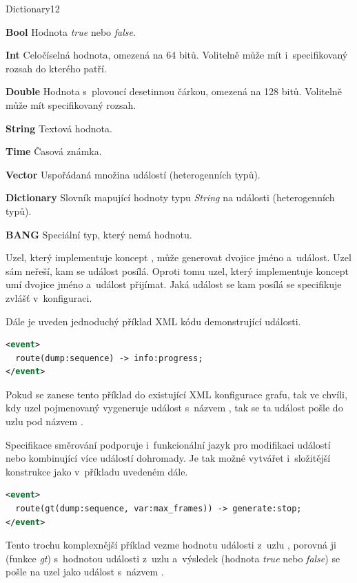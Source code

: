 \documentclass[thesis=M,czech]{FITthesis}[2012/06/26]
\begin{document}
\begin{labeling}{Dictionary12}
\item [\textbf{Bool}] Hodnota \textit{true} nebo \textit{false}.
\item [\textbf{Int}] Celočíselná hodnota, omezená na 64 bitů. Volitelně může mít i~specifikovaný rozsah do kterého patří.
\item [\textbf{Double}] Hodnota s~plovoucí desetinnou čárkou, omezená na 128 bitů. Volitelně může mít specifikovaný rozsah.
\item [\textbf{String}] Textová hodnota.
\item [\textbf{Time}] Časová známka.
\item [\textbf{Vector}] Uspořádaná množina událostí (heterogenních typů).
\item [\textbf{Dictionary}] Slovník mapující hodnoty typu \textit{String} na události (heterogenních typů).
\item [\textbf{BANG}] Speciální typ, který nemá hodnotu.
\end{labeling}

Uzel, který implementuje koncept , může generovat dvojice jméno a~událost. Uzel sám neřeší, kam se událost posílá. Oproti tomu uzel, který implementuje koncept  umí dvojice jméno a~událost přijímat. Jaká událost se kam posílá se specifikuje zvlášť v~konfiguraci.

Dále je uveden jednoduchý příklad XML kódu demonstrující události.\\

\begin{lstlisting}[language=XML]
<event>
  route(dump:sequence) -> info:progress;
</event>
\end{lstlisting}
Pokud se zanese tento příklad do existující XML konfigurace grafu, tak ve chvíli, kdy uzel pojmenovaný  vygeneruje událost s~názvem , tak se ta událost pošle do uzlu  pod názvem .

Specifikace směrování podporuje i~funkcionální jazyk pro modifikaci událostí nebo kombinující více událostí dohromady. Je tak možné vytvářet i~složitější konstrukce jako v~příkladu uvedeném dále.\\

\begin{lstlisting}[language=XML]
<event>
  route(gt(dump:sequence, var:max_frames)) -> generate:stop;
</event>
\end{lstlisting}

Tento trochu komplexnější příklad vezme hodnotu události  z~uzlu , porovná ji (funkce \textit{gt}) s~hodnotou události  z~uzlu  a~výsledek (hodnota \textit{true} nebo \textit{false}) se pošle na uzel  jako událost s~názvem .
\end{document}
